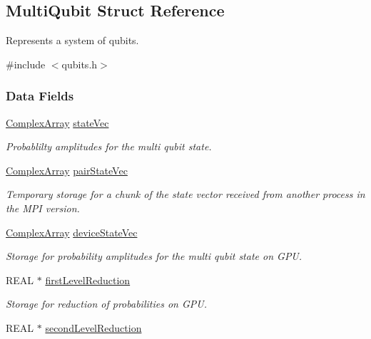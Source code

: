 \hypertarget{structMultiQubit}{
\subsection{MultiQubit Struct Reference}
\label{structMultiQubit}
}


Represents a system of qubits.  


{\ttfamily \#include $<$qubits.h$>$}\subsubsection*{Data Fields}
\begin{DoxyCompactItemize}
\item 
\hyperlink{structComplexArray}{ComplexArray} \hyperlink{structMultiQubit_a45483190d6b01ef6b2f98f2bec9ab94f}{stateVec}
\begin{DoxyCompactList}\small\item\em Probablilty amplitudes for the multi qubit state. \item\end{DoxyCompactList}\item 
\hyperlink{structComplexArray}{ComplexArray} \hyperlink{structMultiQubit_a76f7db4eab52d2b30f58f973ada809c5}{pairStateVec}
\begin{DoxyCompactList}\small\item\em Temporary storage for a chunk of the state vector received from another process in the MPI version. \item\end{DoxyCompactList}\item 
\hyperlink{structComplexArray}{ComplexArray} \hyperlink{structMultiQubit_a59ac613486a41b8c9a4b6e79cc8d2cc3}{deviceStateVec}
\begin{DoxyCompactList}\small\item\em Storage for probability amplitudes for the multi qubit state on GPU. \item\end{DoxyCompactList}\item 
REAL $\ast$ \hyperlink{structMultiQubit_a4e0088b41adab0a40b7a31e528ed42b5}{firstLevelReduction}
\begin{DoxyCompactList}\small\item\em Storage for reduction of probabilities on GPU. \item\end{DoxyCompactList}\item 
REAL $\ast$ \hyperlink{structMultiQubit_a3e859cefa146ec7b30464ab3d897930b}{secondLevelReduction}

\end{DoxyCompactItemize}
